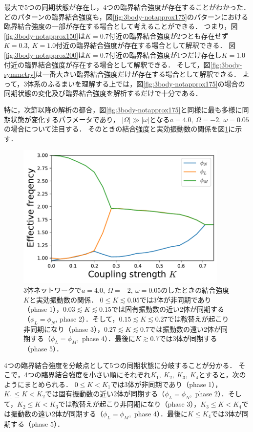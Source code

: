 \documentclass[../main]{subfiles}
\begin{document}
最大で5つの同期状態が存在し，4つの臨界結合強度が存在することがわかった．
どのパターンの臨界結合強度も，図\ref{fig:3body-notapprox175}のパターンにおける臨界結合強度の一部が存在する場合として考えることができる．
つまり，図\ref{fig:3body-notapprox150}は$K=0.7$付近の臨界結合強度が2つとも存在せず$K=0.3,\ K=1.0$付近の臨界結合強度が存在する場合として解釈できる．
図\ref{fig:3body-notapprox200}は$K=0.7$付近の臨界結合強度が1つだけ存在し$K=1.0$付近の臨界結合強度が存在する場合として解釈できる．
そして，図\ref{fig:3body-symmetry}は一番大きい臨界結合強度だけが存在する場合として解釈できる．
よって，3体系のふるまいを理解する上では，図\ref{fig:3body-notapprox175}の場合の同期状態の変化及び臨界結合強度を解析するだけで十分である．

特に，次節以降の解析の都合，図\ref{fig:3body-notapprox175}と同様に最も多様に同期状態が変化するパラメータであり，
$|\Omega|\gg|\omega|$となる$a=4.0,\ \Omega=-2,\ \omega=0.05$の場合について注目する．
そのときの結合強度と実効振動数の関係を図\ref{fig:3body-state}に示す．

\begin{figure}[tbp]
\centering
\includegraphics[width=105mm]{./images/three-body-prob.pdf}
\centering
\caption{3体ネットワークで$a=4.0,\ \Omega=-2,\ \omega=0.05$のしたときの結合強度$K$と実効振動数の関係．
$0\leq K\lesssim 0.05$では3体が非同期であり（phase 1），$0.03\lesssim K\lesssim 0.15$では固有振動数の近い2体が同期する（$\phi_L=\phi_N$, phase 2）．そして，$0.15 \lesssim K\lesssim 0.27$では鞍替えが起こり非同期になり（phase 3），$0.27\lesssim K\lesssim 0.7$では振動数の遠い2体が同期する（$\phi_L=\phi_M$,\ phase 4）．最後に$K\gtrsim 0.7$では3体が同期する（phase 5）．}
\label{fig:3body-state}
\end{figure}

4つの臨界結合強度を分岐点として5つの同期状態に分岐することが分かる．
そこで，4つの臨界結合強度を小さい順にそれぞれ$K_1,\ K_2,\ K_3,\ K_4$とすると，次のようにまとめられる．
$0\leq K<K_1$では3体が非同期であり（phase 1），$K_1\leq K<K_2$では固有振動数の近い2体が同期する（$\phi_L=\phi_N$,\ phase 2）．そして，$K_2\leq K<K_3$では鞍替えが起こり非同期になり（phase 3），$K_3\leq K<K_4$では振動数の遠い2体が同期する（$\phi_L=\phi_M$,\ phase 4）．最後に$K\leq K_4$では3体が同期する（phase 5）．
\end{document}
